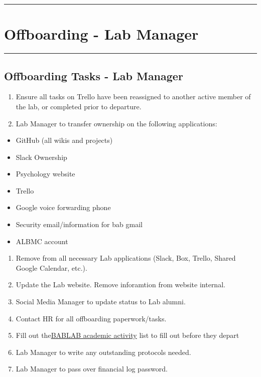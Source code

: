 \documentclass[]{book}
\providecommand{\tightlist}{%
  \setlength{\itemsep}{0pt}\setlength{\parskip}{0pt}}
\begin{document}
\begin{center}\rule{0.5\linewidth}{0.5pt}\end{center}

\hypertarget{offboarding---lab-manager}{%
\section{Offboarding - Lab Manager}\label{offboarding---lab-manager}}

\begin{center}\rule{0.5\linewidth}{0.5pt}\end{center}

\hypertarget{offboarding-tasks---lab-manager}{%
\subsection{Offboarding Tasks - Lab Manager}\label{offboarding-tasks---lab-manager}}

\begin{enumerate}
\def\labelenumi{\arabic{enumi}.}
\tightlist
\item
  Ensure all tasks on Trello have been reassigned to another active member of the lab, or completed prior to departure.
\item
  Lab Manager to transfer ownership on the following applications:
\end{enumerate}

\begin{itemize}
\tightlist
\item
  GitHub (all wikis and projects)
\item
  Slack Ownership
\item
  Psychology website
\item
  Trello
\item
  Google voice forwarding phone
\item
  Security email/information for bab gmail
\item
  ALBMC account
\end{itemize}

\begin{enumerate}
\def\labelenumi{\arabic{enumi}.}
\setcounter{enumi}{2}
\tightlist
\item
  Remove from all necessary Lab applications (Slack, Box, Trello, Shared Google Calendar, etc.).
\item
  Update the Lab website. Remove inforamtion from website internal.
\item
  Social Media Manager to update status to Lab alumni.
\item
  Contact HR for all offboarding paperwork/tasks.
\item
  Fill out the\href{https://docs.google.com/spreadsheets/d/1BDrPZkQR2k0A2yIzCgjrRj-ve8a-tWYQdN2QSSsppbQ/edit?usp=sharing}{BABLAB academic activity} list to fill out before they depart
\item
  Lab Manager to write any outstanding protocols needed.
\item
  Lab Manager to pass over financial log password.
\end{enumerate}
\end{document}
